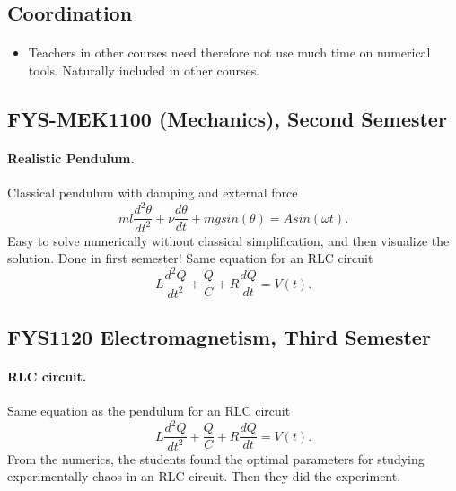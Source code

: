 \documentclass[%
twoside,                 %
final,                   %
10pt]{article}
\begin{document}
\noindent



\subsection*{Coordination}

\paragraph{}
\begin{itemize}
\item Teachers in other courses need therefore not use much time on numerical tools. Naturally included in other courses.
\end{itemize}

\noindent





\subsection*{FYS-MEK1100 (Mechanics), Second Semester}

\paragraph{Realistic Pendulum.}

Classical pendulum with damping and external force
\[
  ml\frac{d^2\theta}{dt^2}+\nu\frac{d\theta}{dt}  +mgsin(\theta)=Asin(\omega t).
\]
Easy to solve numerically without classical simplification, and then visualize the solution.  Done in first semester!
Same equation for an RLC circuit 
\[
L\frac{d^2Q}{dt^2}+\frac{Q}{C}+R\frac{dQ}{dt}=V(t).
\]




\subsection*{FYS1120 Electromagnetism, Third Semester}

\paragraph{RLC circuit.}
Same equation as the pendulum for an RLC circuit 
\[
L\frac{d^2Q}{dt^2}+\frac{Q}{C}+R\frac{dQ}{dt}=V(t).
\]
From the numerics, 
the students found the optimal parameters for studying experimentally chaos
in an RLC circuit. Then they did the experiment.
\end{document}
